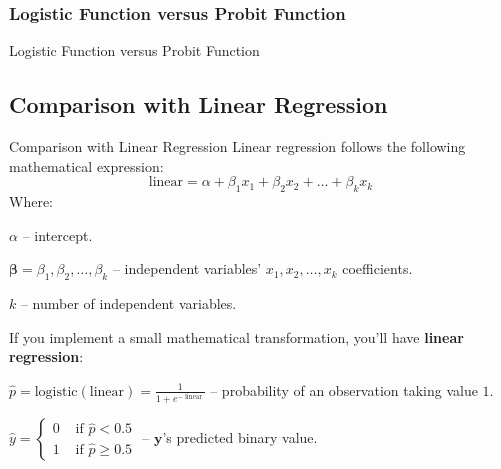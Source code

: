 \subsubsection{Logistic Function versus Probit Function}
\begin{frame}{Logistic Function versus Probit Function}
\end{frame}

\subsection{Comparison with Linear Regression}
\begin{frame}{Comparison with Linear Regression}
	Linear regression follows the following mathematical expression:
	\small
	$$
		\text{linear} = \alpha + \beta_1 x_1 + \beta_2 x_2 + \dots + \beta_k x_k
	$$
	Where:
	\begin{vfilleditems}
		\item \small $\alpha$ -- intercept.
		\item \small $\boldsymbol{\beta} = \beta_1, \beta_2, \dots, \beta_k$ -- independent variables' $x_1, x_2, \dots, x_k$ coefficients.
		\item \small $k$ -- number of independent variables.
	\end{vfilleditems}
	If you implement a small mathematical transformation,
	you'll have \textbf{linear regression}:
	\begin{vfilleditems}
		\item \small $\hat{p} = \text{logistic}(\text{linear}) = \frac{1}{1 + e^{-\operatorname{linear}}}$ --
		probability of an observation taking value $1$.
		\item \small $\hat{y} = \begin{cases} 0 & \text { if } \hat{p} < 0.5 \\ 1 & \text { if } \hat{p} \geq 0.5 \end{cases}$ --
		$\boldsymbol{y}$'s predicted binary value.
	\end{vfilleditems}
\end{frame}

